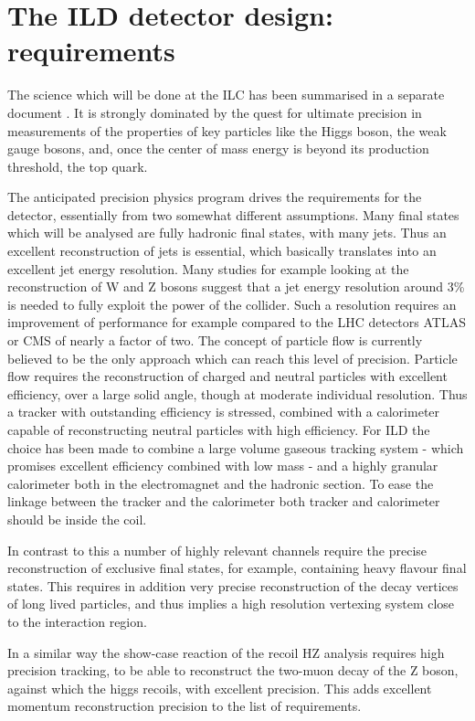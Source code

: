 \documentclass[%
 amsmath,amssymb,
 aps,
]{revtex4-1}
\begin{document}
\section{The ILD detector design: requirements}
The science which will be done at the ILC has been summarised in a separate document \cite{ILC-ESU1}. It is strongly dominated by the quest for ultimate precision in measurements of the properties of key particles like the Higgs boson, the weak gauge bosons, and, once the center of mass energy is beyond its production threshold, the top quark. 

The anticipated precision physics program drives the requirements for the detector, essentially from two somewhat different assumptions. Many final states which will be analysed are fully hadronic final states, with many jets. Thus an excellent reconstruction of jets is essential, which basically translates into an excellent jet energy resolution. Many studies for example looking at the reconstruction of W and Z bosons suggest that a jet energy resolution around 3\% is needed to fully exploit the power of the collider. Such a resolution requires an improvement of performance for example compared to the LHC detectors ATLAS or CMS of nearly a factor of two. The concept of particle flow is currently believed to be the only approach which can reach this level of precision. Particle flow requires the reconstruction of charged and neutral particles with excellent efficiency, over a large solid angle, though at moderate individual resolution. Thus a tracker with outstanding efficiency is stressed, combined with a calorimeter capable of reconstructing neutral particles with high efficiency. For ILD the choice has been made to combine a large volume gaseous tracking system - which promises excellent efficiency combined with low mass - and a highly granular calorimeter both in the electromagnet and the hadronic section. To ease the linkage between the tracker and the calorimeter both tracker and calorimeter should be inside the coil. 

In contrast to this a number of highly relevant channels require the precise reconstruction of exclusive final states, for example, containing heavy flavour final states. This requires in addition very precise reconstruction of the decay vertices of long lived particles, and thus implies a high resolution vertexing system close to the interaction region. 

In a similar way the show-case reaction of the recoil HZ analysis requires high precision tracking, to be able to reconstruct the two-muon decay of the Z boson, against which the higgs recoils, with excellent precision. This adds excellent momentum reconstruction precision to the list of requirements. 
\end{document}
